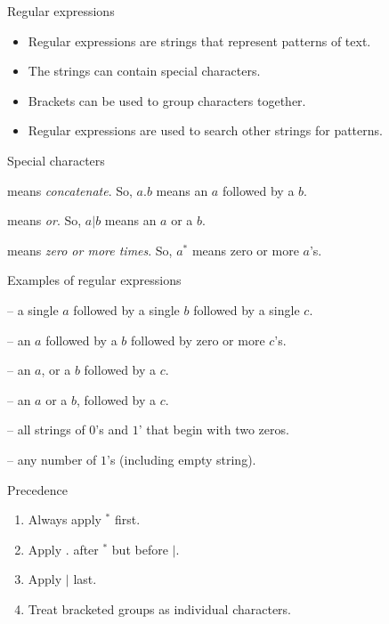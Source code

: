 \begin{frame}{Regular expressions}
  

  \begin{itemize}
    \item Regular expressions are strings that represent patterns of text.
    \item The strings can contain special characters.
    \item Brackets can be used to group characters together.
    \item Regular expressions are used to search other strings for patterns.
  \end{itemize}
  \begin{alertblock}{Special characters}
    \begin{description}[abbb]
      \item[$.$] means \emph{concatenate}. So, $a.b$ means an $a$ followed by a $b$.
      \item[$|$] means \emph{or}. So, $a|b$ means an $a$ or a $b$.
      \item[$*$] means \emph{zero or more times}. So, $a^*$ means zero or more $a$'s.
    \end{description}
  \end{alertblock}
\end{frame}

\begin{frame}{Examples of regular expressions}
  \begin{description}[aaaaaaaa]
    \setlength\itemsep{5mm}
    \item[$a.b.c$] -- a single $a$ followed by a single $b$ followed by a single $c$. 
    \item[$a.b.c^*$] -- an $a$ followed by a $b$ followed by zero or more $c$'s.
    \item[$a|b.c$] -- an $a$, or a $b$ followed by a $c$.
    \item[$(a|b).c$] -- an $a$ or a $b$, followed by a $c$.
    \item[$0.0.(0|1)^*$] -- all strings of $0$'s and $1$' that begin with two zeros.
    \item[$1^*$] -- any number of $1$'s (including empty string).
  \end{description}
\end{frame}

\begin{frame}{Precedence}
  \begin{enumerate}
    \setlength\itemsep{5mm}
    \item Always apply $^*$ first.
    \item Apply $.$ after $^*$ but before $|$.
    \item Apply $|$ last.
    \item Treat bracketed groups as individual characters.
  \end{enumerate}
\end{frame}

